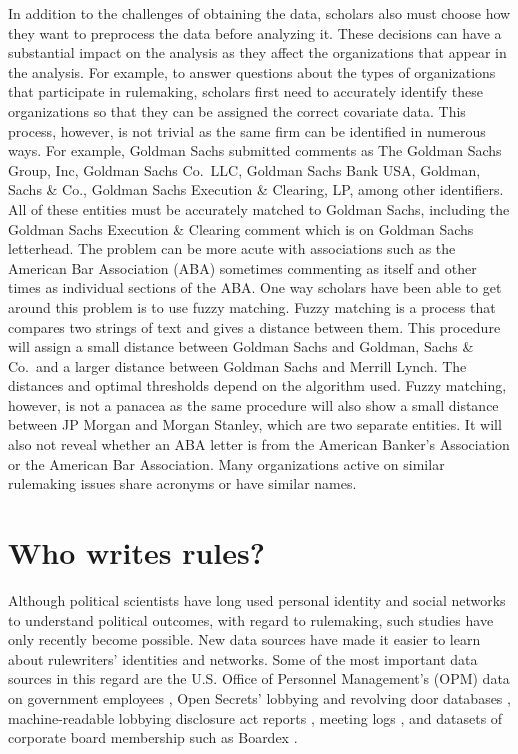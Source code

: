 \documentclass[
      12pt,
        ]{article}
\let\footnote = \endnote
\begin{document}
\indent In addition to the challenges of obtaining the data, scholars
also must choose how they want to preprocess the data before analyzing
it. These decisions can have a substantial impact on the analysis as
they affect the organizations that appear in the analysis. For example,
to answer questions about the types of organizations that participate in
rulemaking, scholars first need to accurately identify these
organizations so that they can be assigned the correct covariate data.
This process, however, is not trivial as the same firm can be identified
in numerous ways. For example, Goldman Sachs submitted comments as The
Goldman Sachs Group, Inc, Goldman Sachs Co.~LLC, Goldman Sachs Bank USA,
Goldman, Sachs \& Co., Goldman Sachs Execution \& Clearing, LP, among
other identifiers. All of these entities must be accurately matched to
Goldman Sachs, including the Goldman Sachs Execution \& Clearing comment
which is on Goldman Sachs letterhead. The problem can be more acute with
associations such as the American Bar Association (ABA) sometimes
commenting as itself and other times as individual sections of the ABA.
One way scholars have been able to get around this problem is to use
fuzzy matching. Fuzzy matching is a process that compares two strings of
text and gives a distance between them. This procedure will assign a
small distance between Goldman Sachs and Goldman, Sachs \& Co.~and a
larger distance between Goldman Sachs and Merrill Lynch. The distances
and optimal thresholds depend on the algorithm used. Fuzzy matching,
however, is not a panacea as the same procedure will also show a small
distance between JP Morgan and Morgan Stanley, which are two separate
entities. It will also not reveal whether an ABA letter is from the
American Banker's Association or the American Bar Association. Many
organizations active on similar rulemaking issues share acronyms or have
similar names.

\hypertarget{who-writes-rules}{%
\section{Who writes rules?}\label{who-writes-rules}}

Although political scientists have long used personal identity and
social networks to understand political outcomes, with regard to
rulemaking, such studies have only recently become possible. New data
sources have made it easier to learn about rulewriters' identities and
networks. Some of the most important data sources in this regard are the
U.S. Office of Personnel Management's (OPM) data on government employees
\citep[e.g.,][]{BoltonAMP2018},\footnote{Note that the dataset
  \citet{BoltonAMP2018} used is not public.} Open Secrets' lobbying
\citep[e.g.,][]{Baumgartner2009} and revolving door databases
\citep[e.g.,][]{VidalAER2012, BertrandAER2014}, machine-readable
lobbying disclosure act reports
\citep[e.g.,][]{BoehmkeJPP2013, YouJOP2017, Dwidar2019SPSA}, meeting
logs \citep{LibgoberQJPS}, and datasets of corporate board membership
such as Boardex \citep[e.g.,][]{ShiveROF2016}.
\end{document}
